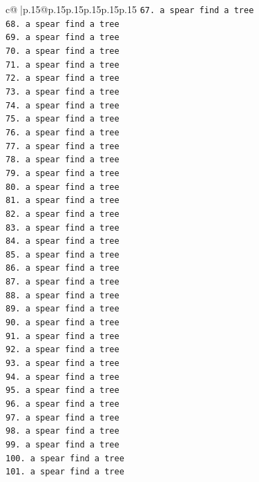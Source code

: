 \documentclass{article}
\begin{document}
{\begin{supertabular}{c@{$\;$}|p{.15\linewidth}@{}p{.15\linewidth}p{.15\linewidth}p{.15\linewidth}p{.15\linewidth}p{.15\linewidth}}
{{{\texttt{67. a spear find a tree} \\
\texttt{68. a spear find a tree} \\
\texttt{69. a spear find a tree} \\
\texttt{70. a spear find a tree} \\
\texttt{71. a spear find a tree} \\
\texttt{72. a spear find a tree} \\
\texttt{73. a spear find a tree} \\
\texttt{74. a spear find a tree} \\
\texttt{75. a spear find a tree} \\
\texttt{76. a spear find a tree} \\
\texttt{77. a spear find a tree} \\
\texttt{78. a spear find a tree} \\
\texttt{79. a spear find a tree} \\
\texttt{80. a spear find a tree} \\
\texttt{81. a spear find a tree} \\
\texttt{82. a spear find a tree} \\
\texttt{83. a spear find a tree} \\
\texttt{84. a spear find a tree} \\
\texttt{85. a spear find a tree} \\
\texttt{86. a spear find a tree} \\
\texttt{87. a spear find a tree} \\
\texttt{88. a spear find a tree} \\
\texttt{89. a spear find a tree} \\
\texttt{90. a spear find a tree} \\
\texttt{91. a spear find a tree} \\
\texttt{92. a spear find a tree} \\
\texttt{93. a spear find a tree} \\
\texttt{94. a spear find a tree} \\
\texttt{95. a spear find a tree} \\
\texttt{96. a spear find a tree} \\
\texttt{97. a spear find a tree} \\
\texttt{98. a spear find a tree} \\
\texttt{99. a spear find a tree} \\
\texttt{100. a spear find a tree} \\
\texttt{101. a spear find a tree} \\
}}}
\end{supertabular}}
\end{document}
